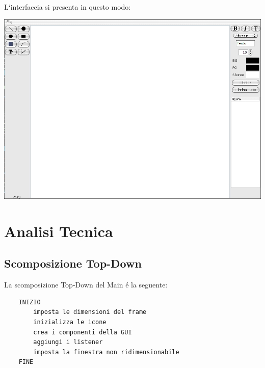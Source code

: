 \documentclass[a4paper,12pt,times,numbered,print,index]{article}
\begin{document}
L`interfaccia si presenta in questo modo:\\
\begin{center}
\includegraphics[scale=0.4]{Immagini/GUI.png}
\end{center}

\section{Analisi Tecnica}

\subsection{Scomposizione Top-Down} \label{TopDown}
La scomposizione Top-Down del Main é la seguente:
\begin{lstlisting}
	INIZIO
		imposta le dimensioni del frame
		inizializza le icone
		crea i componenti della GUI
		aggiungi i listener
		imposta la finestra non ridimensionabile
	FINE
\end{lstlisting}
\end{document}
